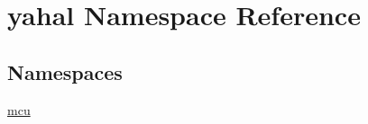 \hypertarget{namespaceyahal}{}\section{yahal Namespace Reference}
\label{namespaceyahal}
\subsection*{Namespaces}
\begin{DoxyCompactItemize}
\item 
 \hyperlink{namespaceyahal_1_1mcu}{mcu}
\end{DoxyCompactItemize}
